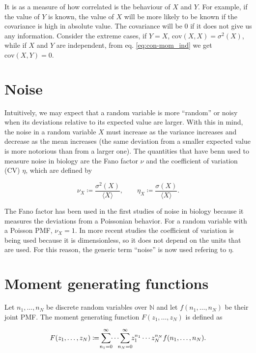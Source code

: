 It is as a measure of how correlated is the behaviour of $X$ and $Y$. For example, if the value of $Y$ is known, the value of $X$ will be more likely to be known if the covariance is high in absolute value. The covariance will be $0$ if it does not give us any information. Consider the extreme cases, if $Y=X$, $\text{cov}(X,X) = \sigma^2(X)$, while if $X$ and $Y$ are independent, from eq. \eqref{eq:con-mom_ind} we get $\text{cov}(X,Y) = 0$.

\section{Noise}
\label{sec:con-noise}
Intuitively, we may expect that a random variable is more ``random'' or noisy when its deviations relative to its expected value are larger. With this in mind, the noise in a random variable $X$ must increase as the variance increases and decrease as the mean increases (the same deviation from a smaller expected value is more notorious than from a larger one). The quantities that have benn used to measure noise in biology are the Fano factor $\nu$ and the coefficient of variation (CV) $\eta$, which are defined by

\begin{equation}
  \label{eq:con-fano_def}
  \nu_X \coloneqq \frac{\sigma^2(X)}{\langle X \rangle},\quad\quad\eta_X \coloneqq \frac{\sigma(X)}{\langle X \rangle}.
\end{equation}

The Fano factor has been used in the first studies of noise in biology because it measures the deviations from a Poissonian behavior. For a random variable with a Poisson PMF, $\nu_X=1$. In more recent studies the coefficient of variation is being used because it is dimensionless, so it does not depend on the units that are used. For this reason, the generic term ``noise'' is now used refering to $\eta$.

\section{Moment generating functions}

Let $n_1,\dotsc,n_N$ be discrete random variables over $\mathbb{N}$ and let $f(n_1,\dotsc,n_N)$ be their joint PMF. The moment generating function $F(z_1,\dotsc,z_N)$ is defined as

\begin{equation}
  \label{def:mom_gen}
  F(z_1,\dotsc,z_N) \coloneqq \sum_{\mathclap{n_1=0}}^{\infty} \dotsi \sum_{\mathclap{n_N=0}}^{\infty} z_1^{n_1} \dotsm z_N^{n_N} f(n_1,\dotsc,n_N).
\end{equation}

